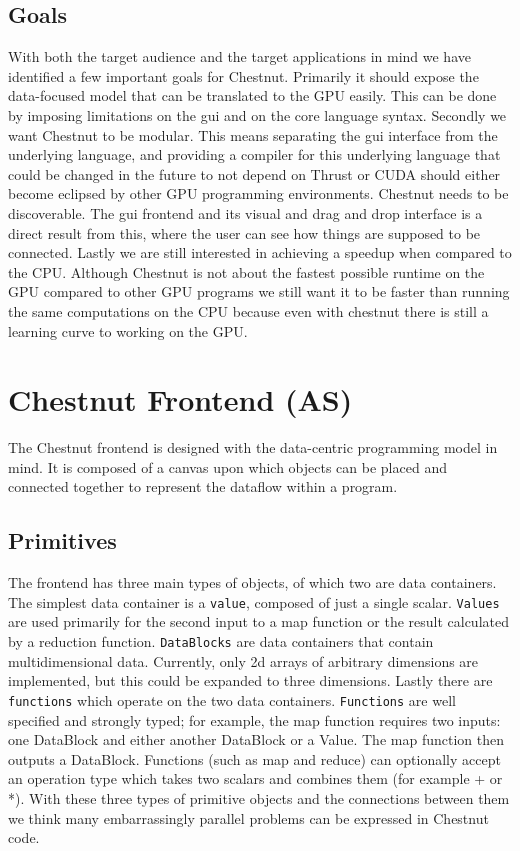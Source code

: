 \documentclass[twocolumn]{article}
\renewcommand{\|}{\origbar} %
\newcommand{\code}[1]{\texttt{#1}}
\begin{document}
\subsection{Goals}

With both the target audience and the target applications in mind we have identified a few important goals for Chestnut. Primarily it should expose the data-focused model that can be translated to the GPU easily. This can be done by imposing limitations on the gui and on the core language syntax. Secondly we want Chestnut to be modular. This means separating the gui interface from the underlying language, and providing a compiler for this underlying language that could be changed in the future to not depend on Thrust or CUDA should either become eclipsed by other GPU programming environments. Chestnut needs to be discoverable. The gui frontend and its visual and drag and drop interface is a direct result from this, where the user can see how things are supposed to be connected. Lastly we are still interested in achieving a speedup when compared to the CPU. Although Chestnut is not about the fastest possible runtime on the GPU compared to other GPU programs we still want it to be faster than running the same computations on the CPU because even with chestnut there is still a learning curve to working on the GPU.

\section{Chestnut Frontend (AS)}

The Chestnut frontend is designed with the data-centric programming model in mind. It is composed of a canvas upon which objects can be placed and connected together to represent the dataflow within a program.

\subsection{Primitives}

The frontend has three main types of objects, of which two are data containers. The simplest data container is a \code{value}, composed of just a single scalar. \code{Values} are used primarily for the second input to a map function or the result calculated by a reduction function. \code{DataBlocks} are data containers that contain multidimensional data. Currently, only 2d arrays of arbitrary dimensions are implemented, but this could be expanded to three dimensions. Lastly there are \code{functions} which operate on the two data containers. \code{Functions} are well specified and strongly typed; for example, the map function requires two inputs: one DataBlock and either another DataBlock or a Value. The map function then outputs a DataBlock. Functions (such as map and reduce) can optionally accept an operation type which takes two scalars and combines them (for example + or *). With these three types of primitive objects and the connections between them we think many embarrassingly parallel problems can be expressed in Chestnut code.
\end{document}

